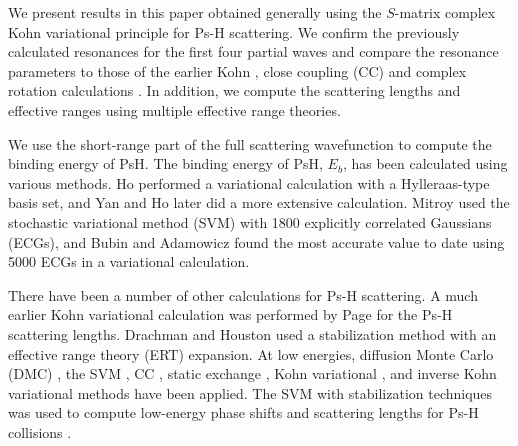 \documentclass[preprint,showpacs,showkeys,preprintnumbers,amsmath,amssymb,longbibliography,pra,aps]{revtex4-1}
\begin{document}
We present results in this paper obtained generally using the $S$-matrix
complex Kohn 
variational principle for Ps-H scattering. We confirm the previously calculated 
resonances for the first four partial waves and compare the resonance parameters
to those of the earlier Kohn \cite{VanReeth2004}, close 
coupling (CC) \cite{Walters2004} and complex rotation calculations
\cite{Yan1999,Yan1998a,Ho1998,Ho2000}. In addition, we compute the scattering
lengths and effective ranges using multiple effective range theories.

We use the short-range part of the full scattering wavefunction to 
compute the binding energy of PsH. The binding energy
of PsH, $E_b$, has been calculated using various methods. Ho \cite{Ho1986}
performed a variational calculation with a Hylleraas-type basis set, and Yan and Ho
\cite{Yan1999} later did a more extensive calculation. Mitroy \cite{Mitroy2006}
used the stochastic variational method (SVM) with 1800 explicitly correlated 
Gaussians (ECGs), and Bubin and Adamowicz \cite{Bubin2006} found the most 
accurate value to date using 5000 ECGs in a variational calculation.

There have been a number of other calculations for Ps-H scattering. A much 
earlier Kohn variational calculation was performed by Page \cite{Page1976} 
for the Ps-H scattering lengths. Drachman and Houston
\cite{Drachman1975,Drachman1976} used
a stabilization method with an effective range theory (ERT) expansion.
At low energies, diffusion Monte Carlo (DMC)
\cite{Chiesa2002}, the SVM \cite{Ivanov2001,Ivanov2002}, CC
\cite{Sinha1997,Campbell1998,Adhikari1999,Sinha2000,Blackwood2002,Blackwood2002b,Walters2004},
static exchange \cite{Hara1975,Ray1997,*Ray1996}, Kohn variational
\cite{Page1976,VanReeth2003,VanReeth2004}, and inverse Kohn
variational \cite{VanReeth2003,VanReeth2004} methods have been applied. The SVM
with stabilization 
techniques was used to compute low-energy phase shifts and 
scattering lengths for Ps-H collisions \cite{Ivanov2001,Ivanov2002}.
\end{document}
